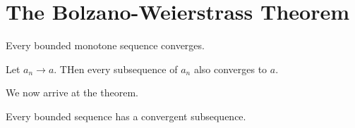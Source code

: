 \section{The Bolzano-Weierstrass Theorem}
\begin{theorem}
Every bounded monotone sequence converges. 
\end{theorem}
\begin{theorem}
Let $a_n \rightarrow a$. THen every subsequence of $a_n$ also converges to $a$. 
\end{theorem}
We now arrive at the  theorem. 
\begin{theorem}
Every bounded sequence has a convergent subsequence. 
\end{theorem}
